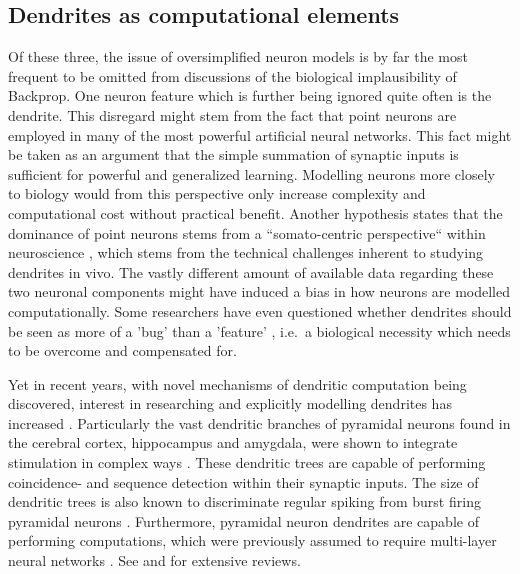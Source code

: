 \subsection{Dendrites as computational elements}\label{sec-dendrites}

Of these three, the issue of oversimplified neuron models is by far the most frequent to be omitted from discussions of
the biological implausibility of Backprop. One neuron feature which is further being ignored quite often is the
dendrite. This disregard might stem from the fact that point neurons are employed in many of the most powerful
artificial neural networks. This fact might be taken as an argument that the simple summation of synaptic inputs is
sufficient for powerful and generalized learning. Modelling neurons more closely to biology would from this perspective
only increase complexity and computational cost without practical benefit. Another hypothesis states that the dominance
of point neurons stems from a ``somato-centric perspective`` within neuroscience \citep{Larkum2018}, which stems from
the technical challenges inherent to studying dendrites in vivo. The vastly different amount of available data regarding
these two neuronal components might have induced a bias in how neurons are modelled computationally. Some researchers
have even questioned whether dendrites should be seen as more of a 'bug' than a 'feature' \citep{Haeusser2003}, i.e.\ a
biological necessity which needs to be overcome and compensated for.

Yet in recent years, with novel mechanisms of dendritic computation being discovered, interest in researching and
explicitly modelling dendrites has increased \citep{Richards2019,guerguiev2017towards}. Particularly the vast dendritic
branches of pyramidal neurons found in the cerebral cortex, hippocampus and amygdala, were shown to integrate
stimulation in complex ways \citep{spruston2008pyramidal}. These dendritic trees are capable of performing coincidence-
\citep{Larkum1999} and sequence detection \citep{Branco2010} within their synaptic inputs. The size of dendritic trees
is also known to discriminate regular spiking from burst firing pyramidal neurons \citep{Elburg2010}. Furthermore,
pyramidal neuron dendrites are capable of performing computations, which were previously assumed to require multi-layer
neural networks \citep{Schiess2016,Gidon2020}. See \citep{Larkum2022} and \citep{Poirazi2020} for extensive reviews.


